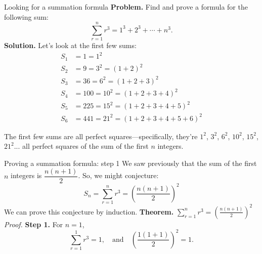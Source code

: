 \documentclass[11pt,aspectratio=1610,handout]{beamer}
\begin{document}
		\begin{frame}{Looking for a summation formula}
			\textbf{Problem.} Find and prove a formula for the following sum:
			\[
			\sum_{r=1}^n r^3 = 1^3 + 2^3 + \cdots + n^3.
			\]\p
			\textbf{Solution.} Let's look at the first few sums: \p
			\begin{align*}
			S_1 &= 1 = 1^2 \\ 
			S_2 &= 9 = 3^2 = (1 + 2)^2 \\ 
			S_3 &= 36 = 6^2 = (1 + 2+3)^2 \\ 
			S_4 &= 100 = 10^2 = (1 + 2 + 3 + 4)^2 \\ 
			S_5 &= 225 = 15^2 = (1 + 2 + 3 + 4 + 5)^2 \\ 
			S_6 &= 441 = 21^2 = (1+2+3+4+5+6)^2 
			\end{align*}
			\p
			
			 The first few sums are all perfect squares---specifically, they're $1^2$, $3^2$, $6^2$, $10^2$, $15^2$, $21^2$... all perfect squares of the sum of the first $n$ integers.
		\end{frame}
		
%		
		\begin{frame}{Proving a summation formula: step 1}
			We saw previously that the sum of the first $n$ integers is $\dfrac{n(n+1)}2$. So, we might conjecture: 
			\[
			S_n = \sum_{r=1}^n r^3 = \left(\frac{n(n+1)}{2}\right)^2
			\]\p
			We can prove this conjecture by induction. \p
			\newline\newline
			\textbf{Theorem.} $\displaystyle \sum_{r=1}^n r^3 = \left(\frac{n(n+1)}2\right)^2$\p
			\newline\newline \p
			\textit{Proof.} \textbf{Step 1.} For $n=1$, 
			\[
			\sum_{r=1}^1 r^3 = 1, \quad \textrm{and} \quad \left( \frac{1(1+1)}{2}\right)^2 = 1.
			\]
		\end{frame}
		
\end{document}
